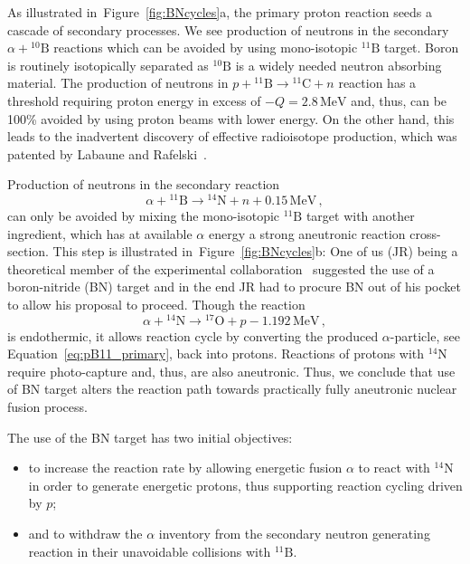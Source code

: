 \documentclass[particles,article,accept,pdftex,moreauthors]{Definitions/mdpi}
\begin{document}
As illustrated in~Figure~\ref{fig:BNcycles}a, the primary proton reaction seeds a cascade of secondary processes. We see production of neutrons in the secondary $\alpha+{}^{10}\mathrm{B}$ reactions which can be avoided by using mono-isotopic ${}^{11}\mathrm{B}$ target. Boron is routinely isotopically separated as ${}^{10}\mathrm{B}$ is a widely needed neutron absorbing material. The production of neutrons in $p+{}^{11}\mathrm{B}\to {}^{11}\mathrm{C}+n$ reaction has a threshold requiring proton energy in excess of $-Q=2.8\,\mathrm{MeV}$ and, thus, can be 100\% avoided by using proton beams with lower energy. On the other hand, this leads to the inadvertent discovery of effective radioisotope production, which was patented by Labaune and Rafelski~\cite{Labaune2019US10217538B2}.

Production of neutrons in the secondary reaction
\begin{equation}
 \alpha+{}^{11}\mathrm{B}\to {}^{14}\mathrm{N}+n+0.15\,\mathrm{MeV}\,,
\end{equation}
can only be avoided by mixing the mono-isotopic ${}^{11}\mathrm{B}$ target with another ingredient, which has at available $\alpha$ energy a strong aneutronic reaction cross-section. This step is illustrated in~Figure~\ref{fig:BNcycles}b: One of us (JR) being a theoretical member of the experimental collaboration~\cite{Labaune:2016mqp} suggested the use of a boron-nitride (BN) target and in the end JR had to procure BN out of his pocket to allow his proposal to proceed. Though the reaction 
\begin{equation}\label{eq:aN}
 \alpha+{}^{14}\mathrm{N}\to {}^{17}\mathrm{O}+p-1.192\,\mathrm{MeV}\,,
\end{equation}
is endothermic, it allows reaction cycle by converting the produced $\alpha$-particle, see Equation~\eqref{eq:pB11_primary}, back into protons. Reactions of protons with ${}^{14}\mathrm{N}$ require photo-capture and, thus, are also aneutronic. Thus, we conclude that use of BN target alters the reaction path towards practically fully aneutronic nuclear fusion process.

The use of the BN target has two initial objectives:
\begin{itemize}
 \item[(a)] to increase the reaction rate by allowing energetic fusion $\alpha$ to react with ${}^{14}\mathrm{N}$ in order to generate energetic protons, thus supporting reaction cycling driven by $p$;
 \item[(b)] and to withdraw the $\alpha$ inventory from the secondary neutron generating reaction in their unavoidable collisions with ${}^{11}\mathrm{B}$.
\end{itemize}
\end{document}
